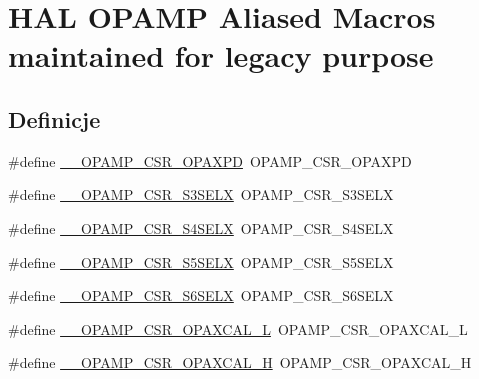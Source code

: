 \hypertarget{group___h_a_l___o_p_a_m_p___aliased___macros}{}\section{H\+AL O\+P\+A\+MP Aliased Macros maintained for legacy purpose}
\label{group___h_a_l___o_p_a_m_p___aliased___macros}
\subsection*{Definicje}
\begin{DoxyCompactItemize}
\item 
\#define \hyperlink{group___h_a_l___o_p_a_m_p___aliased___macros_ga718b230e8a238b0e5de1a23055ebcfe9}{\+\_\+\+\_\+\+O\+P\+A\+M\+P\+\_\+\+C\+S\+R\+\_\+\+O\+P\+A\+X\+PD}~O\+P\+A\+M\+P\+\_\+\+C\+S\+R\+\_\+\+O\+P\+A\+X\+PD
\item 
\#define \hyperlink{group___h_a_l___o_p_a_m_p___aliased___macros_ga03dc06c2d84b2dda47d894897ff92eeb}{\+\_\+\+\_\+\+O\+P\+A\+M\+P\+\_\+\+C\+S\+R\+\_\+\+S3\+S\+E\+LX}~O\+P\+A\+M\+P\+\_\+\+C\+S\+R\+\_\+\+S3\+S\+E\+LX
\item 
\#define \hyperlink{group___h_a_l___o_p_a_m_p___aliased___macros_gaad8ed366f8e8a3c3db8525d5d960a934}{\+\_\+\+\_\+\+O\+P\+A\+M\+P\+\_\+\+C\+S\+R\+\_\+\+S4\+S\+E\+LX}~O\+P\+A\+M\+P\+\_\+\+C\+S\+R\+\_\+\+S4\+S\+E\+LX
\item 
\#define \hyperlink{group___h_a_l___o_p_a_m_p___aliased___macros_ga1e45efa042b54fcd97e76a96d36324ae}{\+\_\+\+\_\+\+O\+P\+A\+M\+P\+\_\+\+C\+S\+R\+\_\+\+S5\+S\+E\+LX}~O\+P\+A\+M\+P\+\_\+\+C\+S\+R\+\_\+\+S5\+S\+E\+LX
\item 
\#define \hyperlink{group___h_a_l___o_p_a_m_p___aliased___macros_gae692a184865ac585c51facbb18dc03cb}{\+\_\+\+\_\+\+O\+P\+A\+M\+P\+\_\+\+C\+S\+R\+\_\+\+S6\+S\+E\+LX}~O\+P\+A\+M\+P\+\_\+\+C\+S\+R\+\_\+\+S6\+S\+E\+LX
\item 
\#define \hyperlink{group___h_a_l___o_p_a_m_p___aliased___macros_ga476dfa7349959c398e971c4e96e656ad}{\+\_\+\+\_\+\+O\+P\+A\+M\+P\+\_\+\+C\+S\+R\+\_\+\+O\+P\+A\+X\+C\+A\+L\+\_\+L}~O\+P\+A\+M\+P\+\_\+\+C\+S\+R\+\_\+\+O\+P\+A\+X\+C\+A\+L\+\_\+L
\item 
\#define \hyperlink{group___h_a_l___o_p_a_m_p___aliased___macros_ga0fec50091b520af8698fddad86932f0d}{\+\_\+\+\_\+\+O\+P\+A\+M\+P\+\_\+\+C\+S\+R\+\_\+\+O\+P\+A\+X\+C\+A\+L\+\_\+H}~O\+P\+A\+M\+P\+\_\+\+C\+S\+R\+\_\+\+O\+P\+A\+X\+C\+A\+L\+\_\+H

\end{DoxyCompactItemize}
